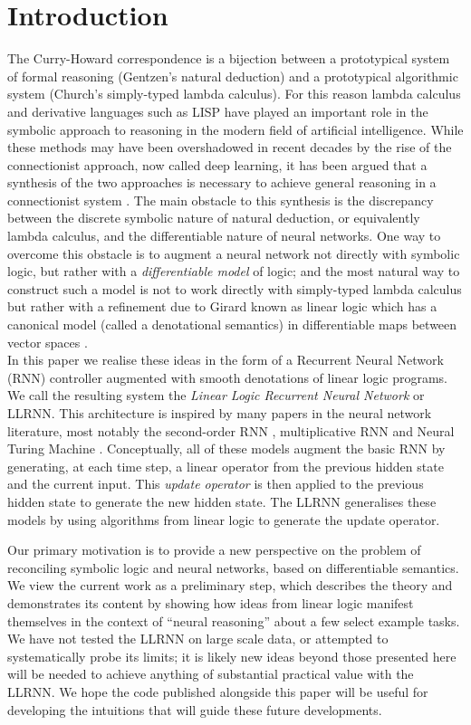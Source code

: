 \documentclass[english,letter paper,12pt,leqno]{article}
\theoremstyle{example}
\numberwithin{equation}{section}
\begin{document}
\section{Introduction}

The Curry-Howard correspondence \cite{sorensen} is a bijection between a prototypical system of formal reasoning (Gentzen's natural deduction) and a prototypical algorithmic system (Church's simply-typed lambda calculus). For this reason lambda calculus and derivative languages such as LISP have played an important role in the symbolic approach to reasoning in the modern field of artificial intelligence. While these methods may have been overshadowed in recent decades by the rise of the connectionist approach, now called deep learning, it has been argued that a synthesis of the two approaches is necessary to achieve general reasoning in a connectionist system \cite{minsky}. The main obstacle to this synthesis is the discrepancy between the discrete symbolic nature of natural deduction, or equivalently lambda calculus, and the differentiable nature of neural networks. One way to overcome this obstacle is to augment a neural network not directly with symbolic logic, but rather with a \emph{differentiable model} of logic; and the most natural way to construct such a model is not to work directly with simply-typed lambda calculus but rather with a refinement due to Girard known as linear logic \cite{girard} which has a canonical model (called a denotational semantics) in differentiable maps between vector spaces \cite{ehrhard-survey,blutecon,murfetclift}. 
\\

In this paper we realise these ideas in the form of a Recurrent Neural Network (RNN) controller \cite{elman} augmented with smooth denotations of linear logic programs. We call the resulting system the \emph{Linear Logic Recurrent Neural Network} or LLRNN. This architecture is inspired by many papers in the neural network literature, most notably the second-order RNN \cite{joulin}, multiplicative RNN \cite{sutskever} and Neural Turing Machine \cite{ntm}. Conceptually, all of these models augment the basic RNN by generating, at each time step, a linear operator from the previous hidden state and the current input. This \emph{update operator} is then applied to the previous hidden state to generate the new hidden state. The LLRNN generalises these models by using algorithms from linear logic to generate the update operator.

Our primary motivation is to provide a new perspective on the problem of reconciling symbolic logic and neural networks, based on differentiable semantics. We view the current work as a preliminary step, which describes the theory and demonstrates its content by showing how ideas from linear logic manifest themselves in the context of ``neural reasoning'' about a few select example tasks. We have not tested the LLRNN on large scale data, or attempted to systematically probe its limits; it is likely new ideas beyond those presented here will be needed to achieve anything of substantial practical value with the LLRNN. We hope the code published alongside this paper will be useful for developing the intuitions that will guide these future developments.
\end{document}
